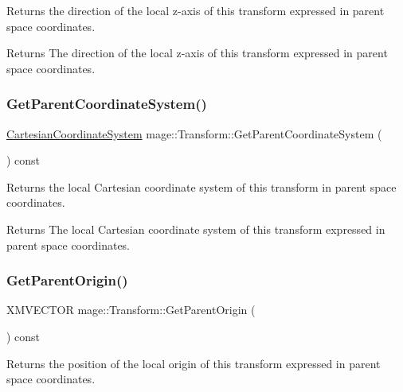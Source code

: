 Returns the direction of the local z-\/axis of this transform expressed in parent space coordinates.

\begin{DoxyReturn}{Returns}
The direction of the local z-\/axis of this transform expressed in parent space coordinates. 
\end{DoxyReturn}
\hypertarget{structmage_1_1_transform_a3d6f03cda826eaf99a2d39e5c900fcbe}{}\label{structmage_1_1_transform_a3d6f03cda826eaf99a2d39e5c900fcbe} 
\subsubsection{\texorpdfstring{Get\+Parent\+Coordinate\+System()}{GetParentCoordinateSystem()}}
{\footnotesize\ttfamily \hyperlink{structmage_1_1_cartesian_coordinate_system}{Cartesian\+Coordinate\+System} mage\+::\+Transform\+::\+Get\+Parent\+Coordinate\+System (\begin{DoxyParamCaption}{ }\end{DoxyParamCaption}) const}

Returns the local Cartesian coordinate system of this transform in parent space coordinates.

\begin{DoxyReturn}{Returns}
The local Cartesian coordinate system of this transform expressed in parent space coordinates. 
\end{DoxyReturn}
\hypertarget{structmage_1_1_transform_a4c33d968669e0342bdff3582825549ae}{}\label{structmage_1_1_transform_a4c33d968669e0342bdff3582825549ae} 
\subsubsection{\texorpdfstring{Get\+Parent\+Origin()}{GetParentOrigin()}}
{\footnotesize\ttfamily X\+M\+V\+E\+C\+T\+OR mage\+::\+Transform\+::\+Get\+Parent\+Origin (\begin{DoxyParamCaption}{ }\end{DoxyParamCaption}) const}

Returns the position of the local origin of this transform expressed in parent space coordinates.

